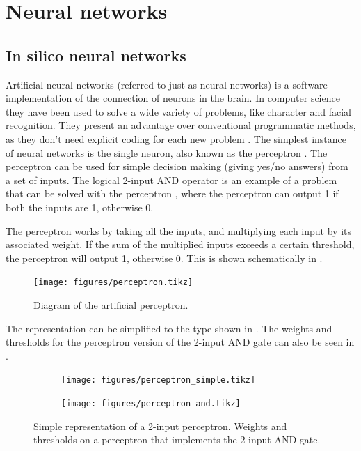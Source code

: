 \section{Neural networks}
\subsection{In silico neural networks}
Artificial neural networks (referred to just as neural networks) is a software implementation of the connection of neurons in the brain. In computer science they have been used to solve a wide variety of problems, like character and facial recognition. They present an advantage over conventional programmatic methods, as they don't need explicit coding for each new problem \cite{Tu1996}. The simplest instance of neural networks is the single neuron, also known as the perceptron \cite{Lippmann}. The perceptron can be used for simple decision making (giving yes/no answers) from a set of inputs. The logical 2-input AND operator is an example of a problem that can be solved with the perceptron \cite{ZhaoYanling}, where the perceptron can output 1 if both the inputs are 1, otherwise 0.

The perceptron works by taking all the inputs, and multiplying each input by its associated weight. If the sum of the multiplied inputs exceeds a certain threshold, the perceptron will output 1, otherwise 0. This is shown schematically in .

\begin{figure}[h]
\texttt{[image: figures/perceptron.tikz]}
\caption{Diagram of the artificial perceptron.}
\label{perceptron}
\end{figure}

The representation can be simplified to the type shown in . The weights and thresholds for the perceptron version of the 2-input AND gate can also be seen in .

\begin{figure}[h]
  \begin{subfigure}[t]{.49\textwidth}
    \texttt{[image: figures/perceptron\_simple.tikz]}
    \caption{}
    \label{perceptron_simple_a}
  \end{subfigure}
  \quad
  \begin{subfigure}[t]{.49\textwidth}
    \texttt{[image: figures/perceptron\_and.tikz]}
    \caption{}
    \label{perceptron_simple_b}
  \end{subfigure}
  \caption{ Simple representation of a 2-input perceptron.  Weights and thresholds on a perceptron that implements the 2-input AND gate.}
  \label{perceptron_simple}
\end{figure}

